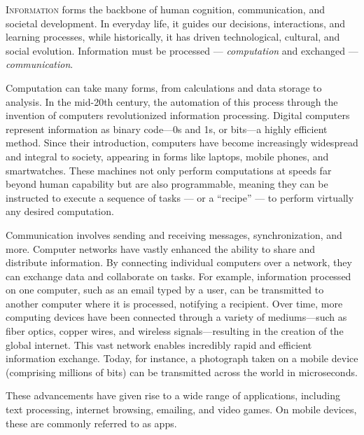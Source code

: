 \lettrine{I}{nformation} forms the backbone of human cognition, communication, and societal development.
In everyday life, it guides our decisions, interactions, and learning processes, while historically, it has driven technological, cultural, and social evolution.
Information must be processed --- \emph{computation} and exchanged --- \emph{communication}.

Computation can take many forms, from calculations and data storage to analysis.
In the mid-20th century, the automation of this process through the invention of computers revolutionized information processing.
Digital computers represent information as binary code—0s and 1s, or bits—a highly efficient method.
Since their introduction, computers have become increasingly widespread and integral to society, appearing in forms like laptops, mobile phones, and smartwatches.
These machines not only perform computations at speeds far beyond human capability but are also programmable, meaning they can be instructed to execute a sequence of tasks --- or a ``recipe'' --- to perform virtually any desired computation.

Communication involves sending and receiving messages, synchronization, and more.
Computer networks have vastly enhanced the ability to share and distribute information.
By connecting individual computers over a network, they can exchange data and collaborate on tasks.
For example, information processed on one computer, such as an email typed by a user, can be transmitted to another computer where it is processed, notifying a recipient.
Over time, more computing devices have been connected through a variety of mediums—such as fiber optics, copper wires, and wireless signals—resulting in the creation of the global internet.
This vast network enables incredibly rapid and efficient information exchange.
Today, for instance, a photograph taken on a mobile device (comprising millions of bits) can be transmitted across the world in microseconds.

These advancements have given rise to a wide range of applications, including text processing, internet browsing, emailing, and video games.
On mobile devices, these are commonly referred to as apps.

